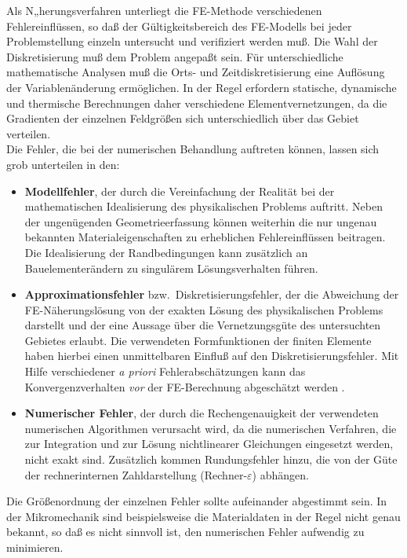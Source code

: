 Als N„herungsverfahren unterliegt die FE-Methode verschiedenen
Fehlereinflüssen, so daß der Gültigkeitsbereich des FE-Modells
bei jeder Problemstellung einzeln untersucht und verifiziert werden muß.
Die Wahl der Diskretisierung muß dem Problem angepaßt sein. Für
unterschiedliche mathematische Analysen muß die Orts- und
Zeitdiskretisierung eine Auflösung der Variablenänderung ermöglichen.
In der Regel erfordern statische, dynamische und thermische Berechnungen
daher verschiedene Elementvernetzungen, da die Gradienten der
einzelnen Feldgrößen sich unterschiedlich über das Gebiet
verteilen.\\
%
Die Fehler, die bei der numerischen Behandlung auftreten können,
lassen sich grob unterteilen in den: %
%
\begin{itemize}
\item
{\bf Modellfehler}, der durch die Vereinfachung der Realität bei
der mathematischen Idealisierung des physikalischen Problems auftritt.
Neben der ungenügenden Geometrieerfassung können weiterhin die nur ungenau
bekannten Materialeigenschaften zu erheblichen Fehlereinflüssen beitragen.
Die Idealisierung der Randbedingungen kann zusätzlich an
Bauelemen\-terändern zu singulärem Lösungsverhalten führen.
\item
{\bf Approximationsfehler} bzw.\ Diskretisierungsfehler, der die
Abweichung der FE-Näherungslösung von der exakten Lösung des
physikalischen Problems darstellt und der eine Aussage über die
Vernetzungsgüte des untersuchten Gebietes erlaubt. Die verwendeten
Formfunktionen der finiten Elemente haben hierbei einen unmittelbaren
Einfluß auf den Diskretisierungsfehler. Mit Hilfe verschiedener
{\em a priori} Fehlerabschätzungen kann das Konvergenzverhalten {\em vor}
der FE-Berechnung abgeschätzt werden \cite{Goe93}.
\item
{\bf Numerischer Fehler}, der durch die
Rechengenauigkeit der verwendeten numerischen Algorithmen verursacht
wird, da die numerischen Verfahren, die zur Integration und zur Lösung
nichtlinearer Gleichungen eingesetzt werden, nicht exakt sind. Zusätzlich
kommen Rundungsfehler hinzu, die von der Güte der rechnerinternen
Zahldarstellung (Rechner-$\varepsilon$) abhängen.
\end{itemize}
%
Die Größenordnung der einzelnen Fehler sollte aufeinander abgestimmt sein.
In der Mikromechanik sind beispielsweise die Materialdaten in der Regel
nicht genau
bekannt, so daß es nicht sinnvoll ist, den numerischen Fehler aufwendig
zu minimieren.\\
